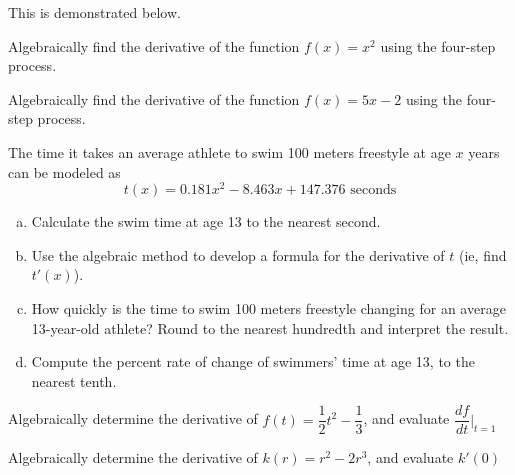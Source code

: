 \documentclass[notes]{subfiles}
\begin{document}
	This is demonstrated below.
		\newpage
		
	\begin{ex}
		Algebraically find the derivative of the function $f(x) = x^2 $ using the four-step process. 
	\end{ex}
 		\newpage
 		
	\begin{ex} 
		Algebraically find the derivative of the function $f(x) = 5x -2$ using the four-step process.
	\end{ex}
		\newpage
		
	\begin{ex}
		The time it takes an average athlete to swim 100 meters freestyle at age $x$ years can be modeled as 
		\[t(x) = 0.181x^2 - 8.463x + 147.376\text{ seconds}\]
			\begin{enumerate}[(a)]
				\item Calculate the swim time at age 13 to the nearest second.
				\item Use the algebraic method to develop a formula for the derivative of $t$ (ie, find $t'(x)$).	
				\item How quickly is the time to swim 100 meters freestyle changing for an average 13-year-old athlete?  Round to the nearest hundredth and interpret the result.
				\item Compute the percent rate of change of swimmers' time at age 13, to the nearest tenth.
			\end{enumerate}
	\end{ex}
		\newpage
		
	\begin{ex}
		Algebraically determine the derivative of $f(t) = \dfrac{1}{2}t^2 -\dfrac{1}{3}$, and evaluate $\dfrac{df}{dt}\bigg|_{t=1}$
	\end{ex}
		\newpage
		
	\begin{ex}
		Algebraically determine the derivative of $k(r) = r^2-2r^3$, and evaluate $k'(0)$
	\end{ex}
	
	\clearpage
\end{document}
